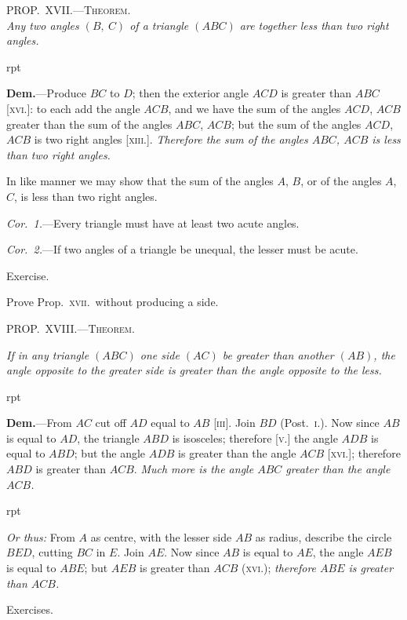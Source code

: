 \documentclass[oneside]{book}
\newcommand\myprop[2]{
\bigskip\Needspace*{4\baselineskip}\begin{center}\textsc{#1}\\\medskip\emph{#2}\par\end{center}
}
\newcommand\mypropl[2]{
\bigskip\Needspace*{4\baselineskip}\begin{center}\textsc{#1}\end{center}
\hspace{\parindent}\emph{#2}\par\medskip
}
\newcommand\exhead[1]{
\Needspace*{5\baselineskip}\begin{center}
\textsf{#1}
\end{center}
}
\newcommand\imgflow[3]{
\setcounter{wrapwidth}{#1}
\begin{wrapfigure}[#2]{r}{\value{wrapwidth}pt}
\begin{center}
\vspace{-0.3in}
\end{center}
\end{wrapfigure}
}
\begin{document}
\myprop{PROP\@.~XVII\@.---Theorem.}{Any two angles $(B,\ C)$ of a triangle $(ABC)$ are together
less than two right angles.}

\imgflow{105}{7}{f032}

\textbf{Dem.}---Produce $BC$ to $D$; then the exterior angle
$ACD$ is greater than $ABC$ [\textsc{xvi.}]:
to each add the angle $ACB$, and
we have the sum of the angles
$ACD$, $ACB$ greater than the sum
of the angles $ABC$, $ACB$; but the
sum of the angles $ACD$, $ACB$ is
two right angles [\textsc{xiii.}]. \textit{Therefore
the sum of the angles $ABC$,
$ACB$ is less than two right angles.}

In like manner we may show that the sum of the
angles $A$, $B$, or of the angles $A$, $C$, is less than two
right angles.

\textit{Cor.~1.}---Every triangle must have at least two
acute angles.

\textit{Cor.~2.}---If two angles of a triangle be unequal, the
lesser must be acute.

\exhead{Exercise.}

\begin{footnotesize}
Prove Prop.~\textsc{xvii.}\ without producing a side.
\par\end{footnotesize}


\mypropl{PROP\@.~XVIII\@.---Theorem.}{If in any triangle $(ABC)$ one side $(AC)$ be greater than
another $(AB)$, the angle opposite to the greater side is
greater than the angle opposite to the less.}

\imgflow{133}{7}{f033}

\textbf{Dem.}---From $AC$ cut off $AD$ equal to $AB$ [\textsc{iii}].
Join $BD$ (Post.~\textsc{i.}). Now
since $AB$ is equal to $AD$, the
triangle $ABD$ is isosceles;
therefore [\textsc{v.}] the angle $ADB$
is equal to $ABD$; but the angle
$ADB$ is greater than the angle
$ACB$ [\textsc{xvi.}]; therefore $ABD$
is greater than $ACB$.  \textit{Much more is the angle $ABC$
greater than the angle $ACB$.}

\imgflow{133}{6}{f034}

\textit{Or thus:} From $A$ as centre,
with the lesser side $AB$ as radius,
describe the circle $BED$,
cutting $BC$ in $E$. Join $AE$.
Now since $AB$ is equal to $AE$,
the angle $AEB$ is equal to
$ABE$; but $AEB$ is greater than
$ACB$ (\textsc{xvi}.); \textit{therefore $ABE$ is greater than $ACB$.}

\exhead{Exercises.}
\end{document}
